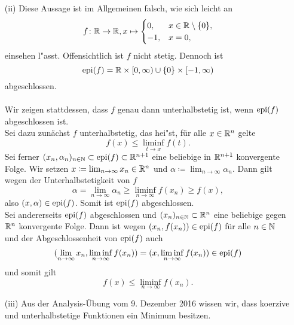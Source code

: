 \begin{itemize}
 \item[(ii)] Diese Aussage ist im Allgemeinen falsch, wie sich leicht an
 \begin{displaymath}
  f\colon\mathbb{R}\to\mathbb{R}, x\mapsto \begin{cases}
                       0, &x\in\mathbb{R}\setminus\{0\},\\
                       -1, &x=0,
                      \end{cases}
 \end{displaymath}
 einsehen l"asst. Offensichtlich ist $f$ nicht stetig. Dennoch ist
 \begin{displaymath}
  \operatorname{epi}(f)=\mathbb{R}\times[0,\infty)\cup\{0\}\times[-1,\infty)
 \end{displaymath}
 abgeschlossen.
 \\ \\
 Wir zeigen stattdessen, dass $f$ genau dann unterhalbstetig ist, wenn $\operatorname{epi}(f)$ abgeschlossen ist.\\
 Sei dazu zunächst $f$ unterhalbstetig, das hei"st, für alle $x\in\mathbb{R}^n$ gelte
 \begin{displaymath}
  f(x)\leq\liminf_{t\to x}f(t).
 \end{displaymath}
 Sei ferner $(x_n,\alpha_n)_{n\in\mathbb{N}}\subset\operatorname{epi}(f)\subset\mathbb{R}^{n+1}$ eine beliebige in $\mathbb{R}^{n+1}$ konvergente Folge.
 Wir setzen $x\coloneqq \lim_{n\to\infty} x_n\in\mathbb{R}^n$ und $\alpha\coloneqq\lim_{n\to\infty}\alpha_n$. Dann gilt
 wegen der Unterhalbstetigkeit von $f$
 \begin{displaymath}
  \alpha= \lim_{n\to\infty}\alpha_n \geq \liminf_{n\to\infty} f(x_n)\geq f(x),
 \end{displaymath}
 also $(x,\alpha)\in\operatorname{epi}(f)$. Somit ist $\operatorname{epi}(f)$ abgeschlossen.\\
 Sei andererseits $\operatorname{epi}(f)$ abgeschlossen und $(x_n)_{n\in\mathbb{N}}\subset \mathbb{R}^n$ eine beliebige gegen $\mathbb{R}^n$ konvergente Folge. Dann ist
 wegen $(x_n,f(x_n))\in\operatorname{epi}(f)$ für alle $n\in\mathbb{N}$ und der Abgeschlossenheit von $\operatorname{epi}(f) $ auch
 \begin{displaymath}
  (\lim_{n\to\infty} x_n,\liminf_{n\to\infty}f(x_n))=(x,\liminf_{n\to\infty}f(x_n))\in\operatorname{epi}(f)
 \end{displaymath}
 und somit gilt
 \begin{displaymath}
  f(x)\leq \liminf_{n\to\infty}f(x_n).
 \end{displaymath}
 \item[(iii)]
 Aus der Analysis-Übung vom 9. Dezember 2016 wissen wir, dass koerzive und unterhalbstetige Funktionen ein
 Minimum besitzen.
\end{itemize}
